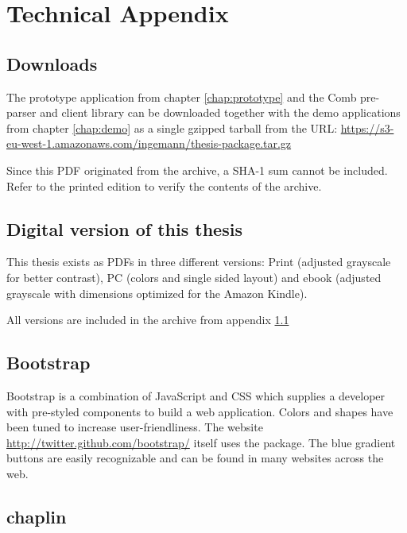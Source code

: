 \documentclass[thesis.tex]{subfiles}
\begin{document}
\chapter{Technical Appendix}

\section{Downloads}
\label{app:downloads}
The prototype application from chapter \ref{chap:prototype} and the Comb
pre-parser and client library can be downloaded together with
the demo applications from chapter \ref{chap:demo} as a single gzipped tarball
from the URL: \url{https://s3-eu-west-1.amazonaws.com/ingemann/thesis-package.tar.gz}

Since this PDF originated from the archive, a SHA-1 sum cannot be included.
Refer to the printed edition to verify the contents of the archive.


\section{Digital version of this thesis}
This thesis exists as PDFs in three different versions:
Print (adjusted grayscale for better contrast),
PC (colors and single sided layout) and
ebook (adjusted grayscale with dimensions optimized for the Amazon Kindle).

All versions are included in the archive from appendix \ref{app:downloads}

\section{Bootstrap}
\label{app:bootstrap}
Bootstrap is a combination of JavaScript and CSS which supplies a developer
with pre-styled components to build a web application. Colors and shapes
have been tuned to increase user-friendliness.
The website \url{http://twitter.github.com/bootstrap/} itself uses the package.
The blue gradient buttons are easily recognizable and can be found in many
websites across the web.

\section{chaplin}
\label{app:chaplin}
\end{document}
